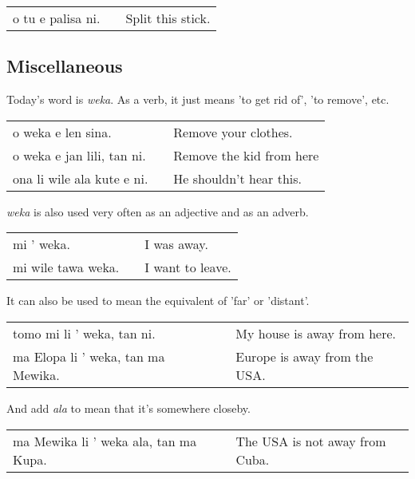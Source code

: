 \begin{supertabular}{p{5,5cm}|ll}
o tu e palisa ni. && Split this stick.  \\
\end{supertabular} 

%
%
\newpage
%
\subsection*{Miscellaneous}
%
%
Today's word is \textit{weka}. 
As a verb, it just means 'to get rid of', 'to remove', etc. 

\begin{supertabular}{p{5,5cm}|ll}
o weka e len sina. && Remove your clothes. \\
o weka e jan lili, tan ni. && Remove the kid from here \\ 
ona li wile ala kute e ni. && He shouldn't hear this. \\ 
\end{supertabular} 

%
\textit{weka} is also used very often as an adjective and as an adverb. 

\begin{supertabular}{p{5,5cm}|ll}
mi ' weka. && I was away. \\
mi wile tawa weka. && I want to leave. \\
\end{supertabular} 

It can also be used to mean the equivalent of 'far' or 'distant'. 

\begin{supertabular}{p{5,5cm}|ll}
tomo mi li ' weka, tan ni. && My house is away from here. \\
ma Elopa li ' weka, tan ma Mewika. && Europe is away from the USA. \\
\end{supertabular} 

And add \textit{ala} to mean that it's somewhere closeby. 

\begin{supertabular}{p{5,5cm}|ll}
ma Mewika li ' weka ala, tan ma Kupa. && The USA is not away from Cuba. \\
\end{supertabular} 


